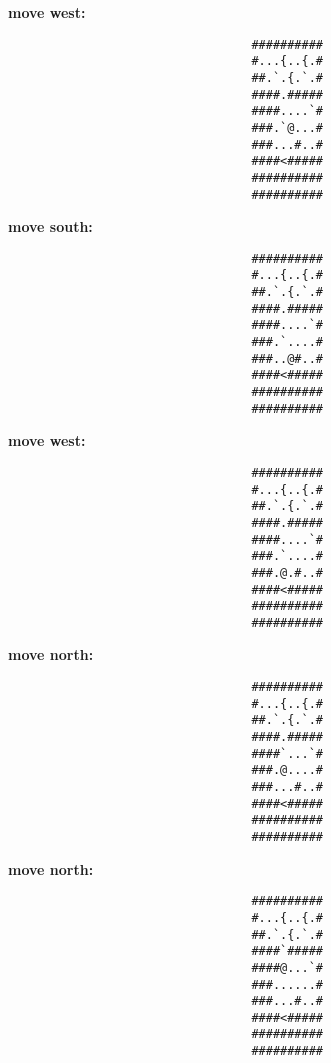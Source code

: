 \begin{MyGreenBox}
{	\textbf{move west:} \begin{verbatim}
                                  ##########
                                  #...{..{.#
                                  ##.`.{.`.#
                                  ####.#####
                                  ####....`#
                                  ###.`@...#
                                  ###...#..#
                                  ####<#####
                                  ##########
                                  ##########
\end{verbatim}

	\textbf{move south:} \begin{verbatim}
                                  ##########
                                  #...{..{.#
                                  ##.`.{.`.#
                                  ####.#####
                                  ####....`#
                                  ###.`....#
                                  ###..@#..#
                                  ####<#####
                                  ##########
                                  ##########
\end{verbatim}

	\textbf{move west:} \begin{verbatim}
                                  ##########
                                  #...{..{.#
                                  ##.`.{.`.#
                                  ####.#####
                                  ####....`#
                                  ###.`....#
                                  ###.@.#..#
                                  ####<#####
                                  ##########
                                  ##########
\end{verbatim}

	\textbf{move north:} \begin{verbatim}
                                  ##########
                                  #...{..{.#
                                  ##.`.{.`.#
                                  ####.#####
                                  ####`...`#
                                  ###.@....#
                                  ###...#..#
                                  ####<#####
                                  ##########
                                  ##########
\end{verbatim}

	\textbf{move north:} \begin{verbatim}
                                  ##########
                                  #...{..{.#
                                  ##.`.{.`.#
                                  ####`#####
                                  ####@...`#
                                  ###......#
                                  ###...#..#
                                  ####<#####
                                  ##########
                                  ##########
\end{verbatim}

}
\end{MyGreenBox}

